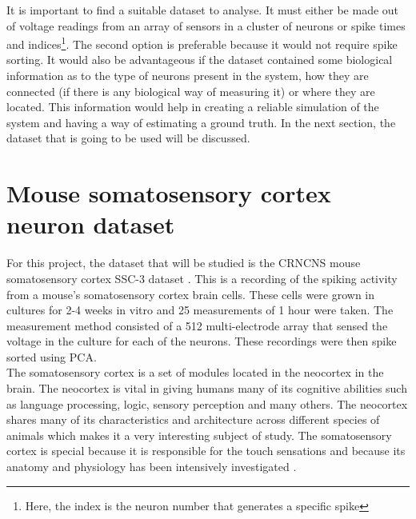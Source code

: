 It is important to find a suitable dataset to analyse. It must either be made out of voltage readings from an array of sensors in a cluster of neurons or spike times and indices\footnote{Here, the index is the neuron number that generates a specific spike}. The second option is preferable because it would not require spike sorting. It would also be advantageous if the dataset contained some biological information as to the type of neurons present in the system, how they are connected (if there is any biological way of measuring it) or where they are located. This information would help in creating a reliable simulation of the system and having a way of estimating a ground truth. In the next section, the dataset that is going to be used will be discussed. 

\section{Mouse somatosensory cortex neuron dataset}

For this project, the dataset that will be studied is the CRNCNS mouse somatosensory cortex SSC-3 dataset \cite{ito2016spontaneous, ito2014large, litke2004does}. This is a recording of the spiking activity from a mouse's somatosensory cortex brain cells. These cells were grown in cultures for 2-4 weeks in vitro and 25 measurements of 1 hour were taken. The measurement method consisted of a 512 multi-electrode array	that sensed the voltage in the culture for each of the neurons. These recordings were then spike sorted using PCA. \\

The somatosensory cortex is a set of modules located in the neocortex in the brain. The neocortex is vital in giving humans many of its cognitive abilities such as language processing, logic, sensory perception and many others. The neocortex shares many of its characteristics and architecture across different species of animals which makes it a very interesting subject of study. The somatosensory cortex is special because it is responsible for the touch sensations and because its anatomy and physiology has been intensively investigated \cite{markram2015reconstruction}.\\

